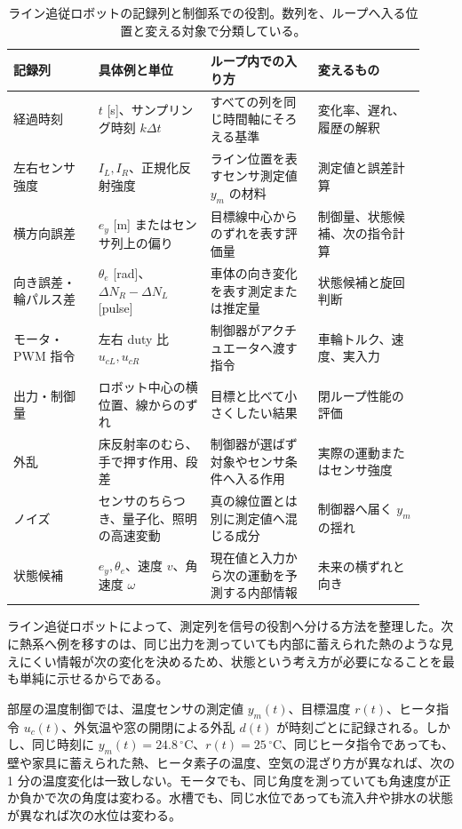 \begingroup
\small
\begin{longtable}{@{}>{\raggedright\arraybackslash}p{0.19\linewidth}>{\raggedright\arraybackslash}p{0.25\linewidth}>{\raggedright\arraybackslash}p{0.24\linewidth}>{\raggedright\arraybackslash}p{0.24\linewidth}@{}}
\caption{ライン追従ロボットの記録列と制御系での役割。数列を、ループへ入る位置と変える対象で分類している。}
\label{tab:line-trace-signal-roles}\\
\hline
記録列 & 具体例と単位 & ループ内での入り方 & 変えるもの\\
\hline
経過時刻 & $t$ [s]、サンプリング時刻 $k\Delta t$ & すべての列を同じ時間軸にそろえる基準 & 変化率、遅れ、履歴の解釈\\
左右センサ強度 & $I_L,I_R$、正規化反射強度 & ライン位置を表すセンサ測定値 $y_m$ の材料 & 測定値と誤差計算\\
横方向誤差 & $e_y$ [m] またはセンサ列上の偏り & 目標線中心からのずれを表す評価量 & 制御量、状態候補、次の指令計算\\
向き誤差・輪パルス差 & $\theta_e$ [rad]、$\Delta N_R-\Delta N_L$ [pulse] & 車体の向き変化を表す測定または推定量 & 状態候補と旋回判断\\
モータ・PWM 指令 & 左右 duty 比 $u_{cL},u_{cR}$ & 制御器がアクチュエータへ渡す指令 & 車輪トルク、速度、実入力\\
出力・制御量 & ロボット中心の横位置、線からのずれ & 目標と比べて小さくしたい結果 & 閉ループ性能の評価\\
外乱 & 床反射率のむら、手で押す作用、段差 & 制御器が選ばず対象やセンサ条件へ入る作用 & 実際の運動またはセンサ強度\\
ノイズ & センサのちらつき、量子化、照明の高速変動 & 真の線位置とは別に測定値へ混じる成分 & 制御器へ届く $y_m$ の揺れ\\
状態候補 & $e_y,\theta_e$、速度 $v$、角速度 $\omega$ & 現在値と入力から次の運動を予測する内部情報 & 未来の横ずれと向き\\
\hline
\end{longtable}
\endgroup

ライン追従ロボットによって、測定列を信号の役割へ分ける方法を整理した。次に熱系へ例を移すのは、同じ出力を測っていても内部に蓄えられた熱のような見えにくい情報が次の変化を決めるため、状態という考え方が必要になることを最も単純に示せるからである。

部屋の温度制御では、温度センサの測定値 $y_m(t)$、目標温度 $r(t)$、ヒータ指令 $u_c(t)$、外気温や窓の開閉による外乱 $d(t)$ が時刻ごとに記録される。しかし、同じ時刻に $y_m(t)=24.8\,^\circ\mathrm{C}$、$r(t)=25\,^\circ\mathrm{C}$、同じヒータ指令であっても、壁や家具に蓄えられた熱、ヒータ素子の温度、空気の混ざり方が異なれば、次の 1 分の温度変化は一致しない。モータでも、同じ角度を測っていても角速度が正か負かで次の角度は変わる。水槽でも、同じ水位であっても流入弁や排水の状態が異なれば次の水位は変わる。

